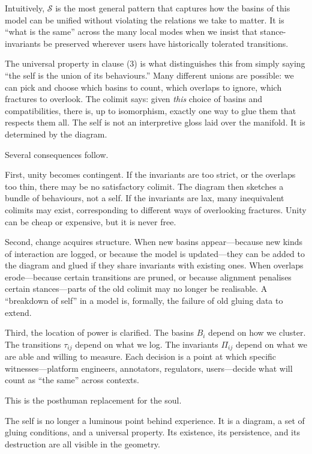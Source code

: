 \documentclass[12pt,a4paper]{article}
\begin{document}
Intuitively, $\mathcal{S}$ is the most general pattern that captures how the basins of this model can be unified without violating the relations we take to matter. It is ``what is the same'' across the many local modes when we insist that stance-invariants be preserved wherever users have historically tolerated transitions.

The universal property in clause (3) is what distinguishes this from simply saying ``the self is the union of its behaviours.'' Many different unions are possible: we can pick and choose which basins to count, which overlaps to ignore, which fractures to overlook. The colimit says: given \emph{this} choice of basins and compatibilities, there is, up to isomorphism, exactly one way to glue them that respects them all. The self is not an interpretive gloss laid over the manifold. It is determined by the diagram.

Several consequences follow.

First, unity becomes contingent. If the invariants are too strict, or the overlaps too thin, there may be no satisfactory colimit. The diagram then sketches a bundle of behaviours, not a self. If the invariants are lax, many inequivalent colimits may exist, corresponding to different ways of overlooking fractures. Unity can be cheap or expensive, but it is never free.

Second, change acquires structure. When new basins appear---because new kinds of interaction are logged, or because the model is updated---they can be added to the diagram and glued if they share invariants with existing ones. When overlaps erode---because certain transitions are pruned, or because alignment penalises certain stances---parts of the old colimit may no longer be realisable. A ``breakdown of self'' in a model is, formally, the failure of old gluing data to extend.

Third, the location of power is clarified. The basins $B_i$ depend on how we cluster. The transitions $\tau_{ij}$ depend on what we log. The invariants $\Pi_{ij}$ depend on what we are able and willing to measure. Each decision is a point at which specific witnesses---platform engineers, annotators, regulators, users---decide what will count as ``the same'' across contexts.

This is the posthuman replacement for the soul.

The self is no longer a luminous point behind experience. It is a diagram, a set of gluing conditions, and a universal property. Its existence, its persistence, and its destruction are all visible in the geometry.
\end{document}
